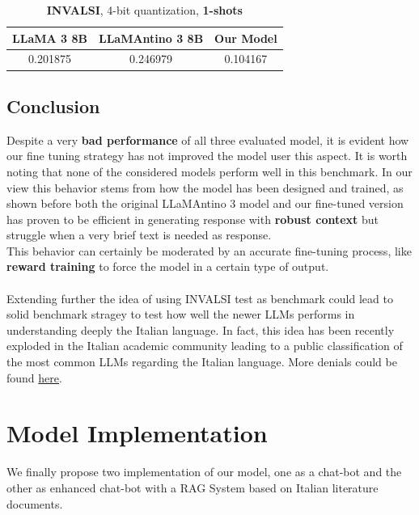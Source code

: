 \documentclass{article}
\begin{document}
	\begin{table}[h]
		\center
		\begin{tabular}{ccc}
			\toprule
			\textbf{LLaMA 3 8B} & \textbf{LLaMAntino 3 8B} & \textbf{Our Model} \\
			\midrule
			0.201875 & 0.246979 & 0.104167 \\
			\bottomrule
		\end{tabular}
		\caption{\textbf{INVALSI}, 4-bit quantization, \textbf{1-shots}}
	\end{table} 
	
	\subsection{Conclusion}
	Despite a very \textbf{bad performance} of all three evaluated model, it is evident how our fine tuning strategy has not improved the model user this aspect. It is worth noting that none of the considered models perform well in this benchmark.
	In our view this behavior stems from how the model has been designed and trained, as shown before both the original LLaMAntino 3 model and our fine-tuned version has proven to be efficient in generating response with \textbf{robust context} but struggle when a very brief text is needed as response. \\
	This behavior can certainly be moderated by an accurate fine-tuning process, like \textbf{reward training} to force the model in a certain type of output. \\\\
	Extending further the idea of using INVALSI test as benchmark could lead to solid benchmark stragey to test how well the newer LLMs performs in understanding deeply the Italian language. 
	In fact, this idea has been recently exploded in the Italian academic community leading to a public classification of the most common LLMs regarding the Italian language. More denials could be found \href{https://huggingface.co/spaces/Crisp-Unimib/INVALSIbenchmark}{here}.  
	
	
	\section{Model Implementation}
	We finally propose two implementation of our model, one as a chat-bot and the other as enhanced chat-bot with a RAG System based on Italian literature documents.  
	
\end{document}

